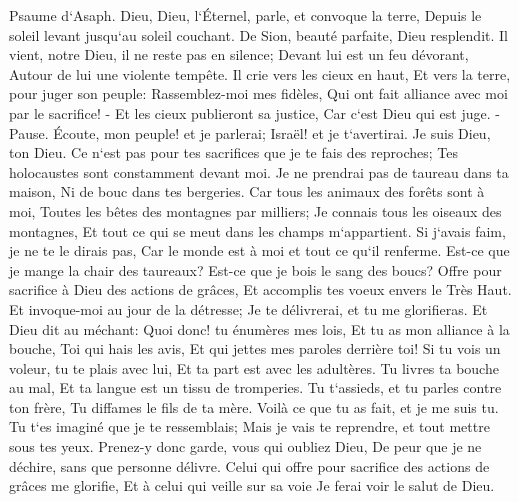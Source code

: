 \verse Psaume d`Asaph. Dieu, Dieu, l`Éternel, parle, et convoque la terre, Depuis le soleil levant jusqu`au soleil couchant. 
\verse De Sion, beauté parfaite, Dieu resplendit. 
\verse Il vient, notre Dieu, il ne reste pas en silence; Devant lui est un feu dévorant, Autour de lui une violente tempête. 
\verse Il crie vers les cieux en haut, Et vers la terre, pour juger son peuple: 
\verse Rassemblez-moi mes fidèles, Qui ont fait alliance avec moi par le sacrifice! - 
\verse Et les cieux publieront sa justice, Car c`est Dieu qui est juge. -Pause. 
\verse Écoute, mon peuple! et je parlerai; Israël! et je t`avertirai. Je suis Dieu, ton Dieu. 
\verse Ce n`est pas pour tes sacrifices que je te fais des reproches; Tes holocaustes sont constamment devant moi. 
\verse Je ne prendrai pas de taureau dans ta maison, Ni de bouc dans tes bergeries. 
\verse Car tous les animaux des forêts sont à moi, Toutes les bêtes des montagnes par milliers; 
\verse Je connais tous les oiseaux des montagnes, Et tout ce qui se meut dans les champs m`appartient. 
\verse Si j`avais faim, je ne te le dirais pas, Car le monde est à moi et tout ce qu`il renferme. 
\verse Est-ce que je mange la chair des taureaux? Est-ce que je bois le sang des boucs? 
\verse Offre pour sacrifice à Dieu des actions de grâces, Et accomplis tes voeux envers le Très Haut. 
\verse Et invoque-moi au jour de la détresse; Je te délivrerai, et tu me glorifieras. 
\verse Et Dieu dit au méchant: Quoi donc! tu énumères mes lois, Et tu as mon alliance à la bouche, 
\verse Toi qui hais les avis, Et qui jettes mes paroles derrière toi! 
\verse Si tu vois un voleur, tu te plais avec lui, Et ta part est avec les adultères. 
\verse Tu livres ta bouche au mal, Et ta langue est un tissu de tromperies. 
\verse Tu t`assieds, et tu parles contre ton frère, Tu diffames le fils de ta mère. 
\verse Voilà ce que tu as fait, et je me suis tu. Tu t`es imaginé que je te ressemblais; Mais je vais te reprendre, et tout mettre sous tes yeux. 
\verse Prenez-y donc garde, vous qui oubliez Dieu, De peur que je ne déchire, sans que personne délivre. 
\verse Celui qui offre pour sacrifice des actions de grâces me glorifie, Et à celui qui veille sur sa voie Je ferai voir le salut de Dieu. 

\chapter{}

